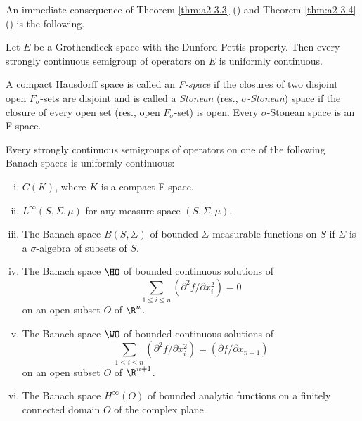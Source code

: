 An immediate consequence of Theorem \ref{thm:a2-3.3} () and Theorem \ref{thm:a2-3.4} () is the following.

\begin{theorem}\label{thm:a2-3.5}
Let $E$ be a Grothendieck space with the Dunford-Pettis property.
Then every strongly continuous semigroup of operators on $E$ is uniformly continuous.
\end{theorem}
A compact Hausdorff space is called an \emph{F-space} if the closures of two disjoint open $F_{\sigma}$-sets are disjoint and is called a \emph{Stonean} (res., \emph{$\sigma$-Stonean}) space if the closure of every open set (res., open $F_{\sigma}$-set) is open.
Every $\sigma$-Stonean space is an F-space.

\begin{theorem}\label{thm:a2-3.6}
Every strongly continuous semigroups of operators on one of the following Banach spaces is uniformly continuous:
\begin{enumerate}[(i)]
\item \label{thm:a2-3.6-1}
$C(K)$, where $K$ is a compact F-space.
\item \label{thm:a2-3.6-2}
$L^{\infty}(S,\Sigma,\mu)$ for any measure space $(S,\Sigma,\mu)$.
\item \label{thm:a2-3.6-3}
The Banach space $B(S,\Sigma)$ of bounded $\Sigma$-measurable functions on $S$ if $\Sigma$ is a $\sigma$-algebra of subsets of $S$.
\item \label{thm:a2-3.6-4}
The Banach space $\HO$ of bounded continuous solutions of
\[
\sum_{1 \leq i \leq n} (\partial^2f/\partial x_i^2) = 0
\]
on an open subset $O$ of $\R^n$.
\item \label{thm:a2-3.6-5}
The Banach space $\WO$ of bounded continuous solutions of
\[
\sum_{1 \leq i \leq n} (\partial^2f/\partial x_i^2) = (\partial f/\partial x_{n+1})
\]
on an open subset $O$ of $\R^{n+1}$.
\item \label{thm:a2-3.6-6}
The Banach space $H^{\infty}(O)$ of bounded analytic functions on a finitely connected domain $O$ of the complex plane.
\end{enumerate}
\end{theorem}

